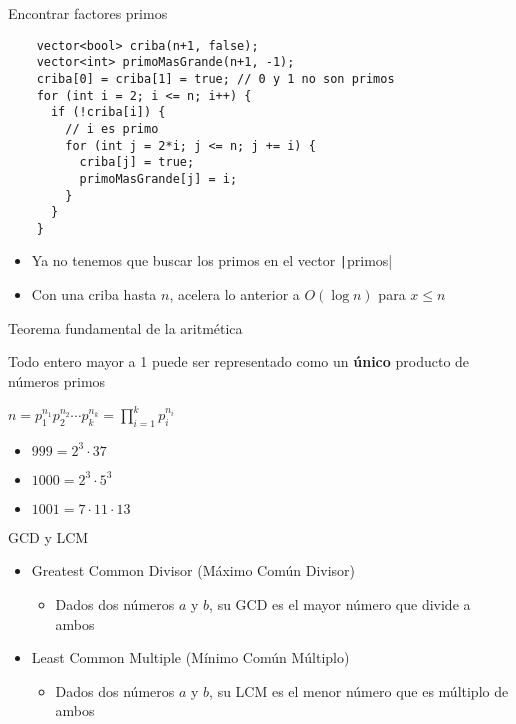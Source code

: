 \documentclass[10pt]{beamer}
\newcommand{\bi}{\begin{itemize}}
\newcommand{\ei}{\end{itemize}}
\begin{document}
\begin{frame}[fragile]{Encontrar factores primos}
  \begin{verbatim}
    vector<bool> criba(n+1, false);
    vector<int> primoMasGrande(n+1, -1);
    criba[0] = criba[1] = true; // 0 y 1 no son primos
    for (int i = 2; i <= n; i++) {
      if (!criba[i]) {
        // i es primo
        for (int j = 2*i; j <= n; j += i) {
          criba[j] = true;
          primoMasGrande[j] = i;
        }
      }
    }
  \end{verbatim}
  \bi
    \item<2-> Ya no tenemos que buscar los primos en el vector \texttt|primos|
    \item<2-> Con una criba hasta $n$, acelera lo anterior a $O(\log n)$ para $x \leq n$
  \ei
\end{frame}

\begin{frame}{Teorema fundamental de la aritmética}
  \begin{center}
    Todo entero mayor a 1 puede ser representado como un \textbf{único} producto de números primos
    
    \vspace{10pt}

    $n = p_1^{n_1} p_2^{n_2} \cdots p_k^{n_k} = \prod_{i=1}^{k}p_i^{n_i}$
  \end{center}

  \vspace{20pt}

  \bi
    \item $999 = 2^3 \cdot 37$
    \item $1000 = 2^3 \cdot 5^3$
    \item $1001 = 7 \cdot 11 \cdot 13$
  \ei
\end{frame}

\begin{frame}{GCD y LCM}
  \bi
    \item Greatest Common Divisor (Máximo Común Divisor)
    \bi
      \item Dados dos números $a$ y $b$, su GCD es el mayor número que divide a ambos
    \ei
    \item Least Common Multiple (Mínimo Común Múltiplo)
    \bi
      \item Dados dos números $a$ y $b$, su LCM es el menor número que es múltiplo de ambos
    \ei
  \ei
\end{frame}
\end{document}
